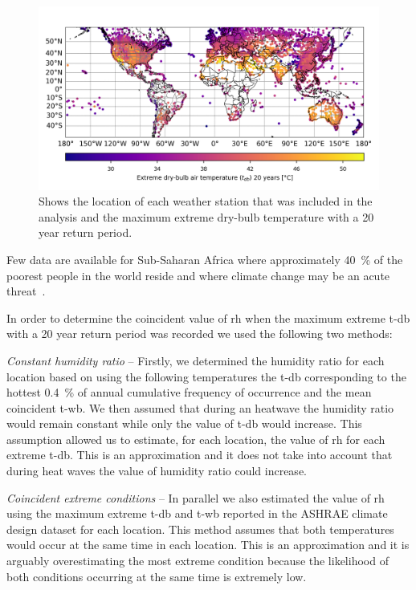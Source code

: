 \begin{figure}[thb!]
    \centering
    \includegraphics[width=\textwidth]{figures/world-map}
    \caption{Shows the location of each weather station that was included in the analysis and the maximum extreme dry-bulb temperature with a 20 year return period.}
    \label{fig:world-map}
\end{figure}

Few data are available for Sub-Saharan Africa where approximately 40~\% of the poorest people in the world reside and where climate change may be an acute threat~\cite{PovertyO1:online}.

In order to determine the coincident value of \ac{rh} when the maximum extreme \ac{t-db} with a 20 year return period was recorded we used the following two methods:

\textit{Constant humidity ratio} -- Firstly, we determined the humidity ratio for each location based on using the following temperatures the \ac{t-db} corresponding to the hottest 0.4~\% of annual cumulative frequency of occurrence and the mean coincident \ac{t-wb}.
We then assumed that during an heatwave the humidity ratio would remain constant while only the value of \ac{t-db} would increase.
This assumption allowed us to estimate, for each location, the value of \ac{rh} for each extreme \ac{t-db}.
This is an approximation and it does not take into account that during heat waves the value of humidity ratio could increase.

\textit{Coincident extreme conditions} -- In parallel we also estimated the value of \ac{rh} using the maximum extreme \ac{t-db} and \ac{t-wb} reported in the ASHRAE climate design dataset for each location.
This method assumes that both temperatures would occur at the same time in each location.
This is an approximation and it is arguably overestimating the most extreme condition because the likelihood of both conditions occurring at the same time is extremely low.

